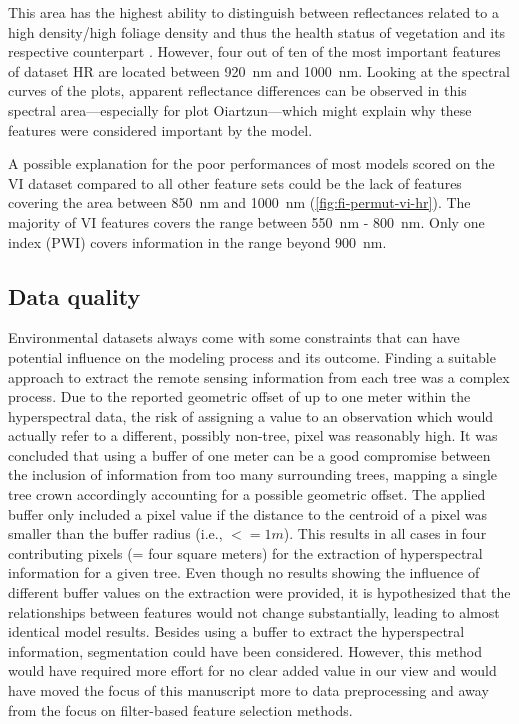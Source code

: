 \documentclass[remotesensing,article,submit,moreauthors,pdftex]{Definitions/mdpi}
\begin{document}
This area has the highest ability to distinguish between reflectances related to a high density/high foliage density and thus the health status of vegetation and its respective counterpart \cite{horler1983}.
However, four out of ten of the most important features of dataset HR are located between 920~nm and 1000~nm.
Looking at the spectral curves of the plots, apparent reflectance differences can be observed in this spectral area---especially for plot Oiartzun---which might explain why these features were considered important by the model.

A possible explanation for the poor performances of most models scored on the VI dataset compared to all other feature sets could be the lack of features covering the area between 850~nm and 1000~nm (\autoref{fig:fi-permut-vi-hr}).
The majority of VI features covers the range between 550~nm - 800~nm.
Only one index (PWI) covers information in the range beyond 900~nm.

\subsection{Data quality}
\label{subsec:data-quality}

Environmental datasets always come with some constraints that can have potential influence on the modeling process and its outcome.
Finding a suitable approach to extract the remote sensing information from each tree was a complex process.
Due to the reported geometric offset of up to one meter within the hyperspectral data, the risk of assigning a value to an observation which would actually refer to a different, possibly non-tree, pixel was reasonably high.
It was concluded that using a buffer of one meter can be a good compromise between the inclusion of information from too many surrounding trees, mapping a single tree crown accordingly accounting for a possible geometric offset.
The applied buffer only included a pixel value if the distance to the centroid of a pixel was smaller than the buffer radius (i.e., $<= 1m$).
This results in all cases in four contributing pixels (= four square meters) for the extraction of hyperspectral information for a given tree.
Even though no results showing the influence of different buffer values on the extraction were provided, it is hypothesized that the relationships between features would not change substantially, leading to almost identical model results.
Besides using a buffer to extract the hyperspectral information, segmentation could have been considered.
However, this method would have required more effort for no clear added value in our view and would have moved the focus of this manuscript more to data preprocessing and away from the focus on filter-based feature selection methods.
\end{document}
